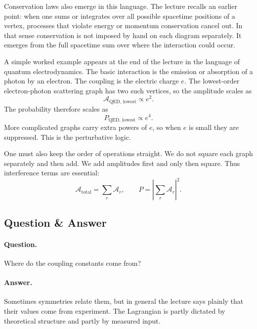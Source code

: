 Conservation laws also emerge in this language. The lecture recalls an earlier point: when one sums or integrates over all possible spacetime positions of a vertex, processes that violate energy or momentum conservation cancel out. In that sense conservation is not imposed by hand on each diagram separately. It emerges from the full spacetime sum over where the interaction could occur.

A simple worked example appears at the end of the lecture in the language of quantum electrodynamics. The basic interaction is the emission or absorption of a photon by an electron. The coupling is the electric charge \(e\). The lowest-order electron-photon scattering graph has two such vertices, so the amplitude scales as
\begin{equation}
\mathcal{A}_{\mathrm{QED,\,lowest}}\propto e^2.
\end{equation}
The probability therefore scales as
\begin{equation}
P_{\mathrm{QED,\,lowest}}\propto e^4.
\end{equation}
More complicated graphs carry extra powers of \(e\), so when \(e\) is small they are suppressed. This is the perturbative logic.

One must also keep the order of operations straight. We do not square each graph separately and then add. We add amplitudes first and only then square. Thus interference terms are essential:
\begin{equation}
\mathcal{A}_{\mathrm{total}}=\sum_r \mathcal{A}_r,
\qquad
P=\left|\sum_r \mathcal{A}_r\right|^2.
\end{equation}

\subsection{Question \& Answer}

\paragraph{Question.} Where do the coupling constants come from?

\paragraph{Answer.} Sometimes symmetries relate them, but in general the lecture says plainly that their values come from experiment. The Lagrangian is partly dictated by theoretical structure and partly by measured input.

